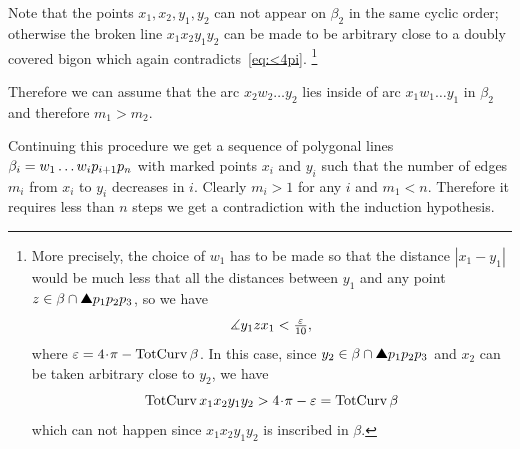 Note that the points $x_1,x_2,y_1,y_2$ can not appear on $\beta_2$ in the same cyclic order;
otherwise the broken line $x_1x_2y_1y_2$ can be made to be arbitrary close to a doubly covered bigon which again contradicts~\ref{eq:<4pi}.%
\footnote{More precisely, the choice of $w_1$ has to be made so that the distance $|x_1-y_1|$ would be much less that all the distances between $y_1$ and any point $z\in\beta\cap \solidtriangle p_1p_2p_3$, so we have
\[\measuredangle y_1zx_1<\tfrac{\varepsilon}{10},\]
where $\eps=4\cdot\pi-\tc\beta$.
In this case, since $y_2\in \beta\cap \solidtriangle p_1p_2p_3$ and $x_2$ can be taken arbitrary close to $y_2$, we have
\[\tc x_1x_2y_1y_2 > 4\cdot\pi -\eps= \tc\beta\]
which can not happen since $x_1x_2y_1y_2$ is inscribed in $\beta$.}

Therefore we can assume that the arc $x_2w_2\dots y_2$ lies inside of arc $x_1w_1\dots y_1$ in $\beta_2$
and therefore $m_1>m_2$.

Continuing this procedure we get a sequence of polygonal lines $\beta_i\z=w_1\dots w_i p_{i+1}p_n$ with marked points $x_i$ and $y_i$ such that the number of edges $m_i$ from $x_i$ to $y_i$ decreases in $i$.
Clearly $m_i>1$ for any $i$ and $m_1<n$.
Therefore it requires less than $n$ steps we get a contradiction with the induction hypothesis.
\qeds




